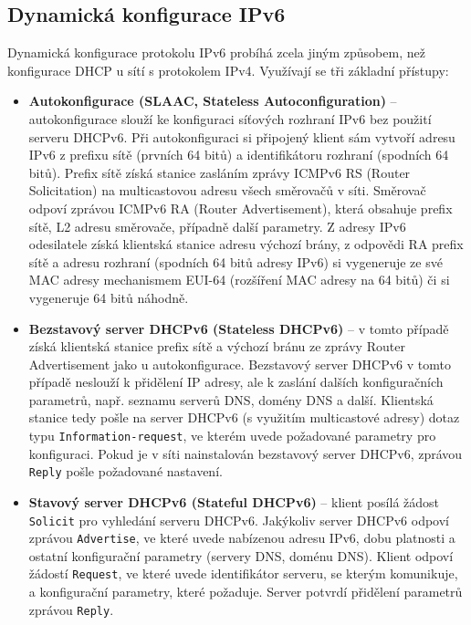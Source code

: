 \subsection{Dynamická konfigurace IPv6}\label{dynipv6}
Dynamická konfigurace protokolu IPv6 probíhá zcela jiným způsobem, než konfigurace DHCP u sítí s protokolem IPv4. Využívají se tři základní přístupy:
\begin{itemize}
  \item {\bf Autokonfigurace (SLAAC, Stateless Autoconfiguration)} \cite{rfc4862} -- autokonfigurace slouží ke konfiguraci síťových rozhraní IPv6 bez použití serveru DHCPv6. Při autokonfiguraci si připojený klient sám vytvoří adresu IPv6 z prefixu sítě (prvních 64 bitů) a identifikátoru rozhraní (spodních 64 bitů). Prefix sítě získá stanice zasláním zprávy ICMPv6 RS (Router Solicitation) na multicastovou adresu všech směrovačů v síti. Směrovač odpoví zprávou ICMPv6 RA (Router Advertisement), která obsahuje prefix sítě, L2 adresu směrovače, případně další parametry. Z adresy IPv6 odesilatele získá klientská stanice adresu výchozí brány, z odpovědi RA prefix sítě a adresu rozhraní (spodních 64 bitů adresy IPv6) si vygeneruje ze své MAC adresy mechanismem EUI-64 (rozšíření MAC adresy na 64 bitů) či si vygeneruje 64 bitů náhodně.
  \item {\bf Bezstavový server DHCPv6 (Stateless DHCPv6)} \cite{rfc8415} -- v tomto případě získá klientská stanice prefix sítě a výchozí bránu ze zprávy Router Advertisement jako u autokonfigurace. Bezstavový server DHCPv6 v tomto případě neslouží k přidělení IP adresy, ale k zaslání dalších konfiguračních parametrů, např. seznamu serverů DNS, domény DNS a další. Klientská stanice tedy pošle na server DHCPv6 (s využitím multicastové adresy) dotaz typu {\tt Information-request}, ve kterém uvede požadované parametry pro konfiguraci. Pokud je v síti nainstalován bezstavový server DHCPv6, zprávou {\tt Reply} pošle požadované nastavení.
  \item {\bf Stavový server DHCPv6 (Stateful DHCPv6)} \cite{rfc8415} -- klient posílá žádost {\tt Solicit} pro vyhledání serveru DHCPv6. Jakýkoliv server DHCPv6 odpoví zprávou {\tt Advertise}, ve které uvede nabízenou adresu IPv6, dobu platnosti a ostatní konfigurační parametry (servery DNS, doménu DNS). Klient odpoví žádostí {\tt Request}, ve které uvede identifikátor serveru, se kterým komunikuje, a konfigurační parametry, které požaduje. Server potvrdí přidělení parametrů zprávou {\tt Reply}. 
\end{itemize}

